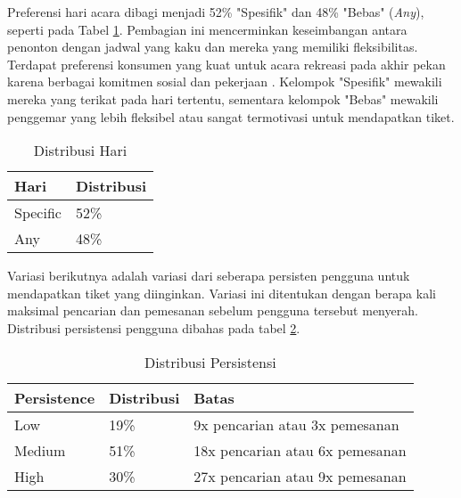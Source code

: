 Preferensi hari acara dibagi menjadi 52\% "Spesifik" dan 48\% "Bebas" (\textit{Any}), seperti pada Tabel \ref{table:distribusi-hari}. Pembagian ini mencerminkan keseimbangan antara penonton dengan jadwal yang kaku dan mereka yang memiliki fleksibilitas. Terdapat preferensi konsumen yang kuat untuk acara rekreasi pada akhir pekan karena berbagai komitmen sosial dan pekerjaan \parencite{rgate2013}. Kelompok "Spesifik" mewakili mereka yang terikat pada hari tertentu, sementara kelompok "Bebas" mewakili penggemar yang lebih fleksibel atau sangat termotivasi untuk mendapatkan tiket.

\begin{table}[h]
    \centering
    \caption{Distribusi Hari}
    \label{table:distribusi-hari}
    \begin{tabular}{|l|l|}
        \hline
        \textbf{Hari} & \textbf{Distribusi} \\
        \hline
        Specific      & 52\%                \\
        \hline
        Any           & 48\%                \\
        \hline
    \end{tabular}
\end{table}

Variasi berikutnya adalah variasi dari seberapa persisten pengguna untuk mendapatkan tiket yang diinginkan. Variasi ini ditentukan dengan berapa kali maksimal pencarian dan pemesanan sebelum pengguna tersebut menyerah. Distribusi persistensi pengguna dibahas pada tabel \ref{table:distribusi-persistensi}.

\begin{table}[h]
    \centering
    \caption{Distribusi Persistensi}
    \label{table:distribusi-persistensi}
    \begin{tabular}{|l|l|l|}
        \hline
        \textbf{Persistence} & \textbf{Distribusi} & \textbf{Batas}                      \\
        \hline
        Low                  & 19\%                & 9x pencarian atau 3x pemesanan      \\
        \hline
        Medium               & 51\%                & 18x pencarian atau 6x     pemesanan \\
        \hline
        High                 & 30\%                & 27x pencarian atau 9x pemesanan     \\
        \hline
    \end{tabular}
\end{table}

